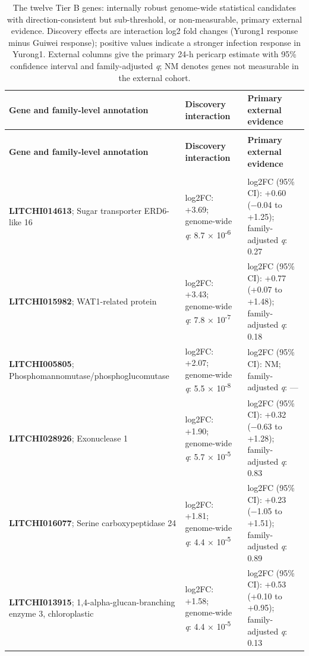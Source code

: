 \documentclass[12pt,letterpaper]{article}
\begin{document}
\clearpage
\setlength{\tabcolsep}{5pt}
\begin{longtable}{@{}>{\raggedright\arraybackslash}p{}>{\raggedright\arraybackslash}p{}>{\raggedright\arraybackslash}p{}@{}}
\caption{The twelve Tier B genes: internally robust genome-wide statistical candidates with direction-consistent but sub-threshold, or non-measurable, primary external evidence. Discovery effects are interaction log2 fold changes (Yurong1 response minus Guiwei response); positive values indicate a stronger infection response in Yurong1. External columns give the primary 24-h pericarp estimate with 95\% confidence interval and family-adjusted \textit{q}; NM denotes genes not measurable in the external cohort.} \\
\toprule
\textbf{Gene and family-level annotation} & \textbf{Discovery interaction} & \textbf{Primary external evidence} \\
\midrule
\endfirsthead
\multicolumn{3}{l}{\textit{Table 4 continued}} \\
\toprule
\textbf{Gene and family-level annotation} & \textbf{Discovery interaction} & \textbf{Primary external evidence} \\
\midrule
\endhead
\midrule \multicolumn{3}{r}{\textit{Continued on next page}} \\
\endfoot
\bottomrule
\endlastfoot
\textbf{LITCHI014613}; Sugar transporter ERD6-like 16 & log2FC: +3.69; genome-wide \textit{q}: 8.7 × 10\textsuperscript{-6} & log2FC (95\% CI): +0.60 (−0.04 to +1.25); family-adjusted \textit{q}: 0.27 \\
\textbf{LITCHI015982}; WAT1-related protein & log2FC: +3.43; genome-wide \textit{q}: 7.8 × 10\textsuperscript{-7} & log2FC (95\% CI): +0.77 (+0.07 to +1.48); family-adjusted \textit{q}: 0.18 \\
\textbf{LITCHI005805}; Phosphomannomutase/phosphoglucomutase & log2FC: +2.07; genome-wide \textit{q}: 5.5 × 10\textsuperscript{-8} & log2FC (95\% CI): NM; family-adjusted \textit{q}: — \\
\textbf{LITCHI028926}; Exonuclease 1 & log2FC: +1.90; genome-wide \textit{q}: 5.7 × 10\textsuperscript{-5} & log2FC (95\% CI): +0.32 (−0.63 to +1.28); family-adjusted \textit{q}: 0.83 \\
\textbf{LITCHI016077}; Serine carboxypeptidase 24 & log2FC: +1.81; genome-wide \textit{q}: 4.4 × 10\textsuperscript{-5} & log2FC (95\% CI): +0.23 (−1.05 to +1.51); family-adjusted \textit{q}: 0.89 \\
\textbf{LITCHI013915}; 1,4-alpha-glucan-branching enzyme 3, chloroplastic & log2FC: +1.58; genome-wide \textit{q}: 4.4 × 10\textsuperscript{-5} & log2FC (95\% CI): +0.53 (+0.10 to +0.95); family-adjusted \textit{q}: 0.13 \\

\end{longtable}
\end{document}
